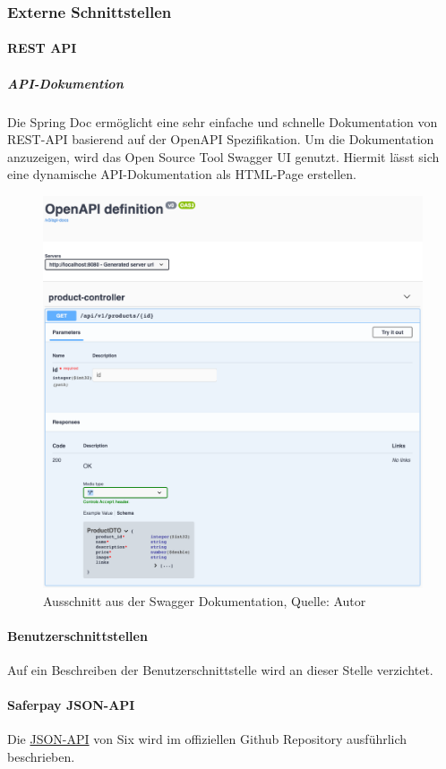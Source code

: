 \subsubsection{Externe Schnittstellen}
\paragraph{REST API}
\subparagraph{API-Dokumention}
Die Spring Doc ermöglicht eine sehr einfache und schnelle Dokumentation von REST-API basierend auf der OpenAPI Spezifikation. Um die Dokumentation anzuzeigen, wird das Open Source Tool Swagger UI genutzt. Hiermit lässt sich eine dynamische API-Dokumentation als HTML-Page erstellen. 
\begin{figure}[H]
	\centering
	\includegraphics[scale=0.3]{images/swaggerui.png}
	\caption[Ausschnitt aus der Swagger Dokumentation]{Ausschnitt aus der Swagger Dokumentation, Quelle: Autor}
	\label{img: swaggerUI}
\end{figure}
\paragraph{Benutzerschnittstellen}
Auf ein Beschreiben der Benutzerschnittstelle wird an dieser Stelle verzichtet. 
\paragraph{Saferpay JSON-API}
Die \href{http://saferpay.github.io/jsonapi/}{JSON-API} von Six wird im offiziellen \gls{Github} Repository ausführlich beschrieben. 


